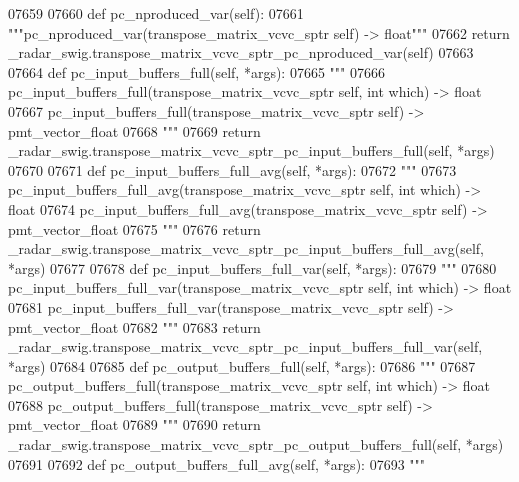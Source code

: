 \begin{DoxyCode}
{{{{{{{{{{{{{{{{{{{{{{{{{07659 
07660     \textcolor{keyword}{def }pc_nproduced_var(self):
07661         \textcolor{stringliteral}{"""pc\_nproduced\_var(transpose\_matrix\_vcvc\_sptr self) -> float"""}
07662         \textcolor{keywordflow}{return} \_radar\_swig.transpose\_matrix\_vcvc\_sptr\_pc\_nproduced\_var(self)
07663 
07664     \textcolor{keyword}{def }pc_input_buffers_full(self, *args):
07665         \textcolor{stringliteral}{"""}
07666 \textcolor{stringliteral}{        pc\_input\_buffers\_full(transpose\_matrix\_vcvc\_sptr self, int which) -> float}
07667 \textcolor{stringliteral}{        pc\_input\_buffers\_full(transpose\_matrix\_vcvc\_sptr self) -> pmt\_vector\_float}
07668 \textcolor{stringliteral}{        """}
07669         \textcolor{keywordflow}{return} \_radar\_swig.transpose\_matrix\_vcvc\_sptr\_pc\_input\_buffers\_full(self, *args)
07670 
07671     \textcolor{keyword}{def }pc_input_buffers_full_avg(self, *args):
07672         \textcolor{stringliteral}{"""}
07673 \textcolor{stringliteral}{        pc\_input\_buffers\_full\_avg(transpose\_matrix\_vcvc\_sptr self, int which) -> float}
07674 \textcolor{stringliteral}{        pc\_input\_buffers\_full\_avg(transpose\_matrix\_vcvc\_sptr self) -> pmt\_vector\_float}
07675 \textcolor{stringliteral}{        """}
07676         \textcolor{keywordflow}{return} \_radar\_swig.transpose\_matrix\_vcvc\_sptr\_pc\_input\_buffers\_full\_avg(self, *args)
07677 
07678     \textcolor{keyword}{def }pc_input_buffers_full_var(self, *args):
07679         \textcolor{stringliteral}{"""}
07680 \textcolor{stringliteral}{        pc\_input\_buffers\_full\_var(transpose\_matrix\_vcvc\_sptr self, int which) -> float}
07681 \textcolor{stringliteral}{        pc\_input\_buffers\_full\_var(transpose\_matrix\_vcvc\_sptr self) -> pmt\_vector\_float}
07682 \textcolor{stringliteral}{        """}
07683         \textcolor{keywordflow}{return} \_radar\_swig.transpose\_matrix\_vcvc\_sptr\_pc\_input\_buffers\_full\_var(self, *args)
07684 
07685     \textcolor{keyword}{def }pc_output_buffers_full(self, *args):
07686         \textcolor{stringliteral}{"""}
07687 \textcolor{stringliteral}{        pc\_output\_buffers\_full(transpose\_matrix\_vcvc\_sptr self, int which) -> float}
07688 \textcolor{stringliteral}{        pc\_output\_buffers\_full(transpose\_matrix\_vcvc\_sptr self) -> pmt\_vector\_float}
07689 \textcolor{stringliteral}{        """}
07690         \textcolor{keywordflow}{return} \_radar\_swig.transpose\_matrix\_vcvc\_sptr\_pc\_output\_buffers\_full(self, *args)
07691 
07692     \textcolor{keyword}{def }pc_output_buffers_full_avg(self, *args):
07693         \textcolor{stringliteral}{"""}
}}}}}}}}}}}}}}}}}}}}}}}}}
\end{DoxyCode}
